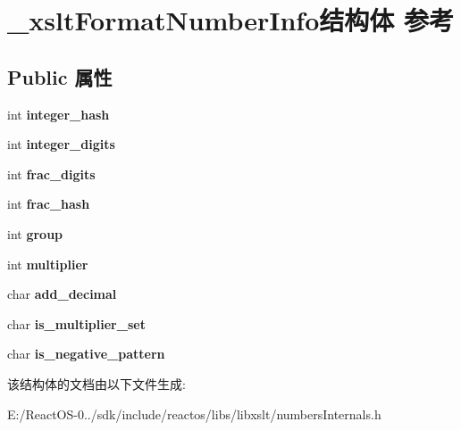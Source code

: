 \hypertarget{struct__xslt_format_number_info}{}\section{\+\_\+xslt\+Format\+Number\+Info结构体 参考}
\label{struct__xslt_format_number_info}
\subsection*{Public 属性}
\begin{DoxyCompactItemize}
\item 
\mbox{\label{struct__xslt_format_number_info_a508279d9a45e9c1c5455b0a593ba2371}} 
int {\bfseries integer\+\_\+hash}
\item 
\mbox{\label{struct__xslt_format_number_info_a320a1064f359bd85aa63d4e08290297a}} 
int {\bfseries integer\+\_\+digits}
\item 
\mbox{\label{struct__xslt_format_number_info_a3e8aded9e78161815469eb071aca658a}} 
int {\bfseries frac\+\_\+digits}
\item 
\mbox{\label{struct__xslt_format_number_info_a4732a33df1d1b97270e818df4f908f45}} 
int {\bfseries frac\+\_\+hash}
\item 
\mbox{\label{struct__xslt_format_number_info_add6ecc003512c48b8098f7032435d9ba}} 
int {\bfseries group}
\item 
\mbox{\label{struct__xslt_format_number_info_a354df6513c1599a17f44acb75b21fcdc}} 
int {\bfseries multiplier}
\item 
\mbox{\label{struct__xslt_format_number_info_a3bcc013afb93fe5384cbe745f901c59d}} 
char {\bfseries add\+\_\+decimal}
\item 
\mbox{\label{struct__xslt_format_number_info_a872ef6ddc48b45af6bf9935ba037cd70}} 
char {\bfseries is\+\_\+multiplier\+\_\+set}
\item 
\mbox{\label{struct__xslt_format_number_info_a1da29df2a6828faa78494db65f1151b9}} 
char {\bfseries is\+\_\+negative\+\_\+pattern}
\end{DoxyCompactItemize}


该结构体的文档由以下文件生成\+:\begin{DoxyCompactItemize}
\item 
E\+:/\+React\+O\+S-\/0../sdk/include/reactos/libs/libxslt/numbers\+Internals.\+h\end{DoxyCompactItemize}
